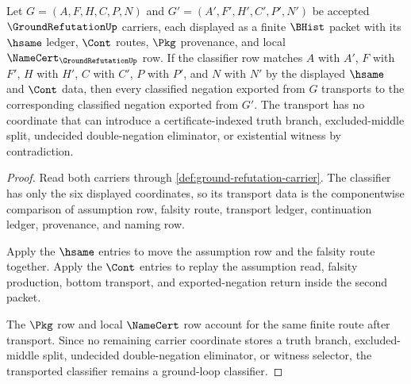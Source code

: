 \begin{theorem}
\label{thm:ground-refutation-classifier-transport}
Let $G=(A,F,H,C,P,N)$ and $G'=(A',F',H',C',P',N')$ be accepted $\GroundRefutationUp$ carriers, each displayed as a finite $\BHist$ packet with its $\hsame$ ledger, $\Cont$ routes, $\Pkg$ provenance, and local $\NameCert_{\GroundRefutationUp}$ row. If the classifier row matches $A$ with $A'$, $F$ with $F'$, $H$ with $H'$, $C$ with $C'$, $P$ with $P'$, and $N$ with $N'$ by the displayed $\hsame$ and $\Cont$ data, then every classified negation exported from $G$ transports to the corresponding classified negation exported from $G'$. The transport has no coordinate that can introduce a certificate-indexed truth branch, excluded-middle split, undecided double-negation eliminator, or existential witness by contradiction.
\end{theorem}
\begin{proof}
Read both carriers through \autoref{def:ground-refutation-carrier}. The classifier has only the six displayed coordinates, so its transport data is the componentwise comparison of assumption row, falsity route, transport ledger, continuation ledger, provenance, and naming row.

Apply the $\hsame$ entries to move the assumption row and the falsity route together. Apply the $\Cont$ entries to replay the assumption read, falsity production, bottom transport, and exported-negation return inside the second packet.

The $\Pkg$ row and local $\NameCert$ row account for the same finite route after transport. Since no remaining carrier coordinate stores a truth branch, excluded-middle split, undecided double-negation eliminator, or witness selector, the transported classifier remains a ground-loop classifier.
\end{proof}

